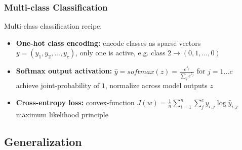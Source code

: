 \documentclass[aspectratio=1610]{beamer}
\begin{document}
\begin{frame}
\frametitle{Multi-class Classification}

Multi-class classification recipe:
\medskip
\begin{itemize}
    \item \textbf{One-hot class encoding:} encode classes as sparse vectors \\
    $y=(y_1, y_2, ..., y_c)$, only one is active, e.g. class $2\rightarrow (0, 1, ..., 0)$
    \item \textbf{Softmax output activation:} $\hat{y}=softmax(z)=\frac{e^{z_{j}}}{\sum_{j}e^{z_{j}}}$ for $j=1...c$\\
    achieve joint-probability of $1$, normalize across model outputs $z$
    \item \textbf{Cross-entropy loss:} convex-function $J(w)=\frac{1}{n}\sum_{i=1}^{n}\sum_{j}^{c}y_{i,j}\log\hat{y}_{i,j}$\\
    maximum likelihood principle
\end{itemize}
\end{frame}

\subsection{Generalization}
\label{subsec:generalization}
\end{document}
